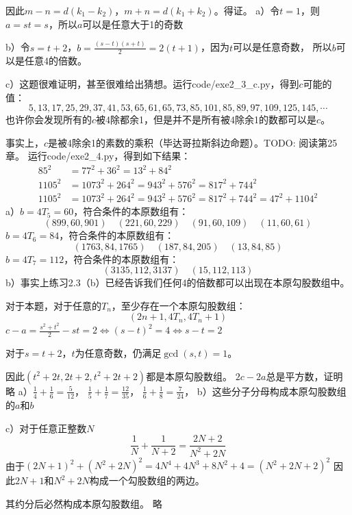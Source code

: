 因此$m-n=d(k_1-k_2)$，$m+n=d(k_1+k_2)$。得证。
%
\exercise 
a）令$t=1$，则$a=st=s$，所以$a$可以是任意大于1的奇数\par
b）令$s=t+2$，$b=\frac{(s-t)(s+t)}{2}=2(t+1)$，因为$t$可以是任意奇数，
所以$b$可以是任意4的倍数。\par
c）这题很难证明，甚至很难给出猜想。运行code/exe2\_3\_c.py，得到$c$可能的值：
\[5, 13, 17, 25, 29, 37, 41, 53, 65, 61, 65, 73, 85, 101, 85, 89, 97, 109, 125, 145,  \cdots\]
也许你会发现所有的$c$被4除都余1，但是并不是所有被4除余1的数都可以是$c$。\par
事实上，$c$是被4除余1的素数的乘积（毕达哥拉斯斜边命题）。TODO: 阅读第25章。
%
\exercise 运行code/exe2\_4.py，得到如下结果：
\begin{align*}
85^2 &= 77^2 + 36^2 = 13^2 + 84^2 \\
1105^2 &= 1073^2 + 264^2 = 943^2 + 576^2 = 817^2 + 744^2 \\
1105^2 &= 1073^2 + 264^2 = 943^2 + 576^2 = 817^2 + 744^2 = 47^2 + 1104^2
\end{align*}    
%
\exercise a）$b=4T_5=60$，符合条件的本原数组有：
\[(899, 60, 901)\quad (221, 60, 229)\quad (91, 60, 109)\quad (11, 60, 61)\]
$b=4T_6=84$，符合条件的本原数组有：
\[(1763, 84, 1765)\quad (187, 84, 205)\quad (13, 84, 85)\]
$b=4T_7=112$，符合条件的本原数组有：
\[(3135, 112, 3137)\quad (15, 112, 113)\]
b）事实上练习2.3（b）已经告诉我们任何4的倍数都可以出现在本原勾股数组中。\par
对于本题，对于任意的$T_n$，至少存在一个本原勾股数组：
\[(2n+1, 4T_n, 4T_n+1)\]
%
\exercise
$c - a = \frac{s^2+t^2}{2} - st = 2 \Leftrightarrow (s-t)^2 = 4 \Leftrightarrow s- t = 2$\par
对于$s = t+2$，$t$为任意奇数，仍满足$\gcd(s, t) = 1$。\par
因此$(t^2+2t, 2t+2, t^2+2t+2)$都是本原勾股数组。
%
\exercise $2c-2a$总是平方数，证明略
%
\exercise a）$\frac{1}{4} + \frac{1}{6} = \frac{5}{12}$，
$\frac{1}{5} + \frac{1}{7} = \frac{12}{35}$，
$\frac{1}{6} + \frac{1}{8} = \frac{7}{24}$，
b）这些分子分母构成本原勾股数组的$a$和$b$\par
c）\proof 对于任意正整数$N$
\[\frac{1}{N} + \frac{1}{N+2} = \frac{2N+2}{N^2+2N}\]
由于$(2N+1)^2 + (N^2+2N)^2 = 4N^4+4N^3+8N^2+4=(N^2+2N+2)^2$
因此$2N+1$和$N^2+2N$构成一个勾股数组的两边。\par
其约分后必然构成本原勾股数组。
%
\exercise 略

